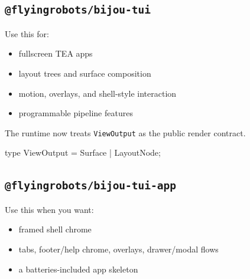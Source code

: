 \subsection{\texorpdfstring{\texttt{@\allowbreak{}f\allowbreak{}l\allowbreak{}y\allowbreak{}i\allowbreak{}n\allowbreak{}g\allowbreak{}r\allowbreak{}o\allowbreak{}b\allowbreak{}o\allowbreak{}t\allowbreak{}s\allowbreak{}/\allowbreak{}b\allowbreak{}i\allowbreak{}j\allowbreak{}o\allowbreak{}u\allowbreak{}-\allowbreak{}t\allowbreak{}u\allowbreak{}i}}{}}\label{record-010-flyingrobotsbijou-tui}

Use this for:

\begin{itemize}
\tightlist
\item
  fullscreen TEA apps
\item
  layout trees and surface composition
\item
  motion, overlays, and shell-style interaction
\item
  programmable pipeline features
\end{itemize}

The runtime now treats \texttt{V\allowbreak{}i\allowbreak{}e\allowbreak{}w\allowbreak{}O\allowbreak{}u\allowbreak{}t\allowbreak{}p\allowbreak{}u\allowbreak{}t} as the public render contract.

\begin{CodeBlock}
type ViewOutput = Surface | LayoutNode;
\end{CodeBlock}

\subsection{\texorpdfstring{\texttt{@\allowbreak{}f\allowbreak{}l\allowbreak{}y\allowbreak{}i\allowbreak{}n\allowbreak{}g\allowbreak{}r\allowbreak{}o\allowbreak{}b\allowbreak{}o\allowbreak{}t\allowbreak{}s\allowbreak{}/\allowbreak{}b\allowbreak{}i\allowbreak{}j\allowbreak{}o\allowbreak{}u\allowbreak{}-\allowbreak{}t\allowbreak{}u\allowbreak{}i\allowbreak{}-\allowbreak{}a\allowbreak{}p\allowbreak{}p}}{}}\label{record-010-flyingrobotsbijou-tui-app}

Use this when you want:

\begin{itemize}
\tightlist
\item
  framed shell chrome
\item
  tabs, footer/help chrome, overlays, drawer/modal flows
\item
  a batteries-included app skeleton
\end{itemize}

